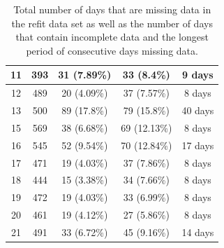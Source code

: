 \begin{table}[H]
\begin{adjustwidth}{-3.0cm}{-3.0cm}
\begin{tabular}{ccccc}
                        11                        & 393                         & 31 (7.89\%)                  & 33 (8.4\%)                      & 9 days                  \\ \midrule
                        12                        & 489                         & 20 (4.09\%)                  & 37 (7.57\%)                     & 8 days                  \\ \midrule
                        13                        & 500                         & 89 (17.8\%)                  & 79 (15.8\%)                     & 40 days                 \\ \midrule
                        15                        & 569                         & 38 (6.68\%)                  & 69 (12.13\%)                    & 8 days                  \\ \midrule
                        16                        & 545                         & 52 (9.54\%)                  & 70 (12.84\%)                    & 17 days                 \\ \midrule
                        17                        & 471                         & 19 (4.03\%)                  & 37 (7.86\%)                     & 8 days                  \\ \midrule
                        18                        & 444                         & 15 (3.38\%)                  & 34 (7.66\%)                     & 8 days                  \\ \midrule
                        19                        & 472                         & 19 (4.03\%)                  & 33 (6.99\%)                     & 8 days                  \\ \midrule
                        20                        & 461                         & 19 (4.12\%)                  & 27 (5.86\%)                     & 8 days                  \\ \midrule
                        21                        & 491                         & 33 (6.72\%)                  & 45 (9.16\%)                     & 14 days                 \\ \bottomrule
                \end{tabular}
                \caption{Total number of days that are missing data in the \gls{refit} data set as well as the number of days that contain incomplete data and the longest period of consecutive days missing data.}
                \label{tab:REFIT-missing-data}
        \end{adjustwidth}
\end{table}

